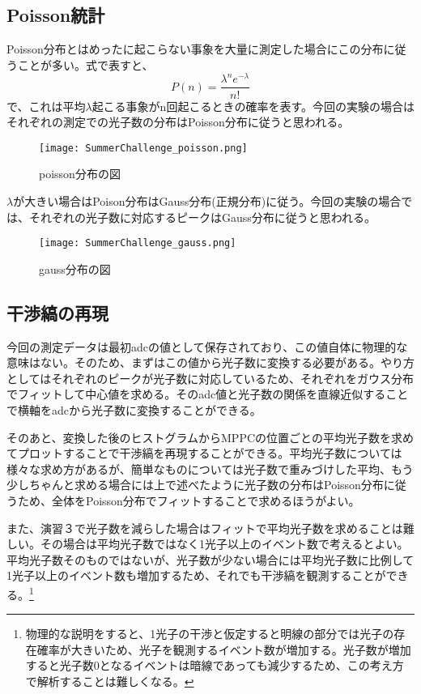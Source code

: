 \documentclass[uplatex,10pt,a4j]{jsarticle}
\begin{document}


\subsection{Poisson統計}
Poisson分布とはめったに起こらない事象を大量に測定した場合にこの分布に従うことが多い。式で表すと、
\begin{equation}
  P\left(n\right)=\frac{\lambda^n e^{-\lambda}}{n!}
\end{equation}
で、これは平均$\lambda$起こる事象がn回起こるときの確率を表す。今回の実験の場合はそれぞれの測定での光子数の分布はPoisson分布に従うと思われる。
\begin{figure}[h]
  \begin{center}
    \texttt{[image: SummerChallenge\_poisson.png]}
    \caption{poisson分布の図}
    \label{fig:poisson}
  \end{center}
\end{figure}

$\lambda$が大きい場合はPoison分布はGauss分布(正規分布)に従う。今回の実験の場合では、それぞれの光子数に対応するピークはGauss分布に従うと思われる。
\begin{figure}[h]
  \begin{center}
    \texttt{[image: SummerChallenge\_gauss.png]}
    \caption{gauss分布の図}
    \label{fig:gauss}
  \end{center}
\end{figure}

\subsection{干渉縞の再現}
今回の測定データは最初adcの値として保存されており、この値自体に物理的な意味はない。そのため、まずはこの値から光子数に変換する必要がある。やり方としてはそれぞれのピークが光子数に対応しているため、それぞれをガウス分布でフィットして中心値を求める。そのadc値と光子数の関係を直線近似することで横軸をadcから光子数に変換することができる。

そのあと、変換した後のヒストグラムからMPPCの位置ごとの平均光子数を求めてプロットすることで干渉縞を再現することができる。平均光子数については様々な求め方があるが、簡単なものについては光子数で重みづけした平均、もう少しちゃんと求める場合には上で述べたように光子数の分布はPoisson分布に従うため、全体をPoisson分布でフィットすることで求めるほうがよい。

また、演習３で光子数を減らした場合はフィットで平均光子数を求めることは難しい。その場合は平均光子数ではなく1光子以上のイベント数で考えるとよい。平均光子数そのものではないが、光子数が少ない場合には平均光子数に比例して1光子以上のイベント数も増加するため、それでも干渉縞を観測することができる。\footnote{物理的な説明をすると、1光子の干渉と仮定すると明線の部分では光子の存在確率が大きいため、光子を観測するイベント数が増加する。光子数が増加すると光子数0となるイベントは暗線であっても減少するため、この考え方で解析することは難しくなる。}
\end{document}
